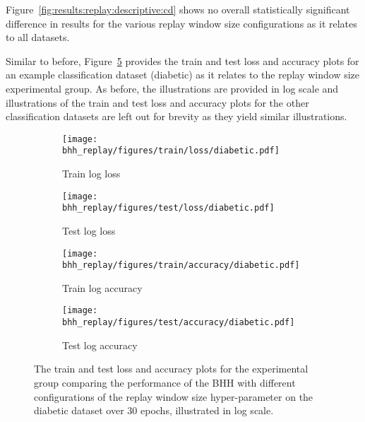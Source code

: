 Figure~\ref{fig:results:replay:descriptive:cd} shows no overall statistically significant difference in results for the various replay window size configurations as it relates to all datasets.

Similar to before, Figure~\ref{fig:results:replay:figures:diabetic} provides the train and test loss and accuracy plots for an example classification dataset (diabetic) as it relates to the replay window size experimental group. As before, the illustrations are provided in log scale and illustrations of the train and test loss and accuracy plots for the other classification datasets are left out for brevity as they yield similar illustrations.

\begin{figure}[htbp]
      \begin{subfigure}{0.5\textwidth}
            \centering
            \texttt{[image: bhh\_replay/figures/train/loss/diabetic.pdf]}
            \caption{Train log loss}
            \label{fig:results:replay:figures:loss:train:diabetic}
      \end{subfigure}
      \begin{subfigure}{0.5\textwidth}
            \centering
            \texttt{[image: bhh\_replay/figures/test/loss/diabetic.pdf]}
            \caption{Test log loss}
            \label{fig:results:replay:figures:loss:test:diabetic}
      \end{subfigure}
      \par\bigskip
      \begin{subfigure}{0.5\textwidth}
            \centering
            \texttt{[image: bhh\_replay/figures/train/accuracy/diabetic.pdf]}
            \caption{Train log accuracy}
            \label{fig:results:replay:figures:accuracy:train:diabetic}
      \end{subfigure}
      \begin{subfigure}{0.5\textwidth}
            \centering
            \texttt{[image: bhh\_replay/figures/test/accuracy/diabetic.pdf]}
            \caption{Test log accuracy}
            \label{fig:results:replay:figures:accuracy:test:diabetic}
      \end{subfigure}
      \par\bigskip
      \caption{The train and test loss and accuracy plots for the experimental group comparing the performance of the \acs{BHH} with different configurations of the replay window size hyper-parameter on the diabetic dataset over 30 epochs, illustrated in log scale.}
      \label{fig:results:replay:figures:diabetic}
\end{figure}

